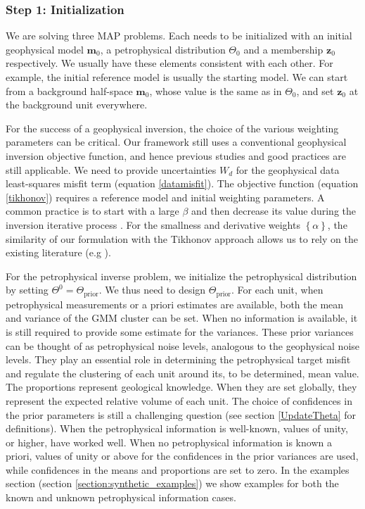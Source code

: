 \documentclass[extra]{gji} %
\begin{document}
\subsubsection{Step 1: Initialization}

We are solving three MAP problems. Each needs to be initialized with an initial geophysical model $\mathbf{m}_0$, a petrophysical distribution $\Theta_0$ and  a membership $\mathbf{z}_0$ respectively. We usually have these elements consistent with each other. For example, the initial reference model is usually the starting model. We can start from a background half-space $\mathbf{m}_0$, whose value is the same as in $\Theta_0$, and set $\mathbf{z}_0$ at the background unit everywhere.

For the success of a geophysical inversion, the choice of the various weighting parameters can be critical. Our framework still uses a conventional geophysical inversion objective function, and hence previous studies and good practices are still applicable. We need to provide uncertainties $W_d$ for the geophysical data least-squares misfit term (equation \ref{datamisfit}). The objective function (equation \ref{tikhonov}) requires a reference model and initial weighting parameters. A common practice is to start with a large $\beta$ and then decrease its value during the inversion iterative process \citep{betachoice2004}. For the smallness and derivative weights $\left\{ \alpha \right\}$, the similarity of our formulation with the Tikhonov approach allows us to rely on the existing literature (e.g \cite{Lelievre2009,doi:10.1190/1.9781560801719.ch5,Williams_2008}).

For the petrophysical inverse problem, we initialize the petrophysical distribution by setting $\Theta^0=\Theta_{\text{prior}}$. We thus need to design $\Theta_{\text{prior}}$. For each unit, when petrophysical measurements or a priori estimates are available, both the mean and variance of the GMM cluster can be set. When no information is available, it is still required to provide some estimate for the variances. These prior variances can be thought of as petrophysical noise levels, analogous to the geophysical noise levels. They play an essential role in determining the petrophysical target misfit and regulate the clustering of each unit around its, to be determined, mean value. The proportions represent geological knowledge. When they are set globally, they represent the expected relative volume of each unit. The choice of confidences in the prior parameters is still a challenging question (see section \ref{UpdateTheta} for definitions). When the petrophysical information is well-known, values of unity, or higher, have worked well. When no petrophysical information is known a priori, values of unity or above for the confidences in the prior variances are used, while confidences in the means and proportions are set to zero. In the examples section (section \ref{section:synthetic_examples}) we show examples for both the known and unknown petrophysical information cases.
\end{document}
